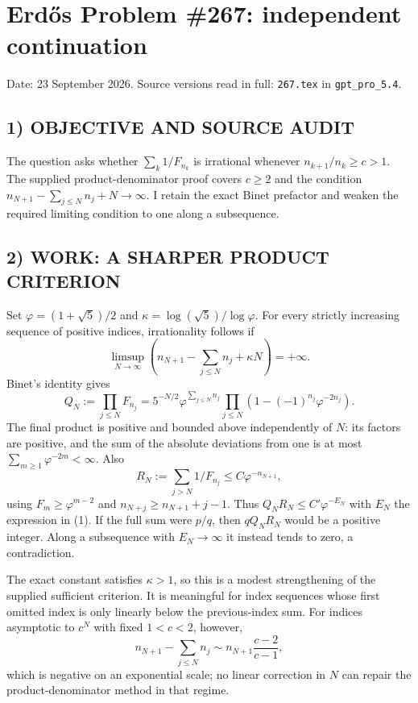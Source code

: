 \section{Erd\H{o}s Problem \#267: independent continuation}
\noindent Date: 23 September 2026. Source versions read in full: \texttt{267.tex} in \texttt{gpt\_pro\_5.4}.

\subsection*{1) OBJECTIVE AND SOURCE AUDIT}
The question asks whether $\sum_k1/F_{n_k}$ is irrational whenever
$n_{k+1}/n_k\ge c>1$. The supplied product-denominator proof covers $c\ge2$
and the condition $n_{N+1}-\sum_{j\le N}n_j+N\to\infty$.
I retain the exact Binet prefactor and weaken the required limiting
condition to one along a subsequence.

\subsection*{2) WORK: A SHARPER PRODUCT CRITERION}
Set $\varphi=(1+\sqrt5)/2$ and
$\kappa=\log(\sqrt5)/\log\varphi$. For every strictly increasing sequence
of positive indices, irrationality follows if
\[
 \limsup_{N\to\infty}
 \left(n_{N+1}-\sum_{j\le N}n_j+\kappa N\right)=+\infty. \tag{1}
\]
Binet's identity gives
\[
 Q_N:=\prod_{j\le N}F_{n_j}
 =5^{-N/2}\varphi^{\sum_{j\le N}n_j}
   \prod_{j\le N}(1-(-1)^{n_j}\varphi^{-2n_j}).
\]
The final product is positive and bounded above independently of $N$:
its factors are positive, and the sum of the absolute deviations from one
is at most $\sum_{m\ge1}\varphi^{-2m}<\infty$. Also
\[
 R_N:=\sum_{j>N}1/F_{n_j}\le C\varphi^{-n_{N+1}},
\]
using $F_m\ge\varphi^{m-2}$ and $n_{N+j}\ge n_{N+1}+j-1$.
Thus $Q_NR_N\le C'\varphi^{-E_N}$ with $E_N$ the expression in (1).
If the full sum were $p/q$, then $qQ_NR_N$ would be a positive integer.
Along a subsequence with $E_N\to\infty$ it instead tends to zero, a
contradiction.

The exact constant satisfies $\kappa>1$, so this is a modest strengthening
of the supplied sufficient criterion. It is meaningful for index sequences
whose first omitted index is only linearly below the previous-index sum.
For indices asymptotic to $c^N$ with fixed $1<c<2$, however,
\[
 n_{N+1}-\sum_{j\le N}n_j
 \sim n_{N+1}\frac{c-2}{c-1},
\]
which is negative on an exponential scale; no linear correction in $N$
can repair the product-denominator method in that regime.

